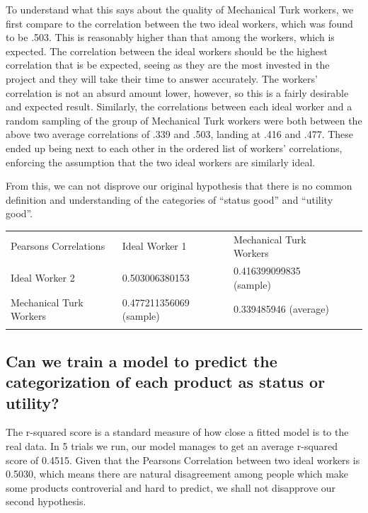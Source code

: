 \documentclass[dvips,12pt]{article}
\begin{document}
To understand what this says about the quality of Mechanical Turk workers, we first compare to the correlation between the two ideal workers, which was found to be .503. This is reasonably higher than that among the workers, which is expected. The correlation between the ideal workers should be the highest correlation that is be expected, seeing as they are the most invested in the project and they will take their time to answer accurately. The workers’ correlation is not an absurd amount lower, however, so this is a fairly desirable and expected result. Similarly, the correlations between each ideal worker and a random sampling of the group of Mechanical Turk workers were both between the above two average correlations of .339 and .503, landing at .416 and .477. These ended up being next to each other in the ordered list of workers’ correlations, enforcing the assumption that the two ideal workers are similarly ideal. 

From this, we can not disprove our original hypothesis that there is no common definition and understanding of the categories of “status good” and “utility good”.

\begin{table}[]
	\centering
	\label{my-label}
	\begin{tabular}{lllll}
		\cline{1-3}
		\multicolumn{1}{|l|}{Pearsons Correlations}   & \multicolumn{1}{l|}{Ideal Worker 1}          & \multicolumn{1}{l|}{Mechanical Turk Workers} &  &  \\ \cline{1-3}
		\multicolumn{1}{|l|}{Ideal Worker 2}          & \multicolumn{1}{l|}{0.503006380153}          & \multicolumn{1}{l|}{0.416399099835 (sample)} &  &  \\ \cline{1-3}
		\multicolumn{1}{|l|}{Mechanical Turk Workers} & \multicolumn{1}{l|}{0.477211356069 (sample)} & \multicolumn{1}{l|}{0.339485946 (average)}   &  &  \\ \cline{1-3}
		&                                              &                                              &  & 
	\end{tabular}
\end{table}

\subsection{Can we train a model to predict the categorization of each product as status or utility? }

The r-squared score is a standard measure of how close a fitted model is to the real data. In 5 trials we run, our model manages to get an average r-squared score of 0.4515. Given that the Pearsons Correlation between two ideal workers is 0.5030, which means there are natural disagreement among people which make some products controverial and hard to predict, we shall not disapprove our second hypothesis.
\end{document}
